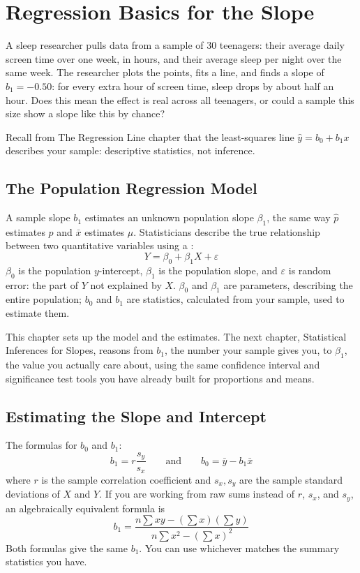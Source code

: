 \chapter{Regression Basics for the Slope}

A sleep researcher pulls data from a sample of $30$ teenagers: their average daily screen time over one week, in hours, and their average sleep per night over the same week. The researcher plots the points, fits a line, and finds a slope of $b_1 = -0.50$: for every extra hour of screen time, sleep drops by about half an hour. Does this mean the effect is real across all teenagers, or could a sample this size show a slope like this by chance?

Recall from The Regression Line chapter that the least-squares line $\hat{y} = b_0 + b_1x$ describes your sample: descriptive statistics, not inference.

\section{The Population Regression Model}
A sample slope $b_1$ estimates an unknown population slope $\beta_1$, the same way $\hat{p}$ estimates $p$ and $\bar{x}$ estimates $\mu$. Statisticians describe the true relationship between two quantitative variables using a :
\[
Y = \beta_0 + \beta_1 X + \varepsilon
\]
$\beta_0$ is the population $y$-intercept, $\beta_1$ is the population slope, and $\varepsilon$ is random error: the part of $Y$ not explained by $X$. $\beta_0$ and $\beta_1$ are parameters, describing the entire population; $b_0$ and $b_1$ are statistics, calculated from your sample, used to estimate them.

This chapter sets up the model and the estimates. The next chapter, Statistical Inferences for Slopes, reasons from $b_1$, the number your sample gives you, to $\beta_1$, the value you actually care about, using the same confidence interval and significance test tools you have already built for proportions and means.

\section{Estimating the Slope and Intercept}

The formulas for $b_0$ and $b_1$:
\[
b_1 = r\frac{s_y}{s_x} \qquad \text{and} \qquad b_0 = \bar{y} - b_1\bar{x}
\]
where $r$ is the sample correlation coefficient and $s_x, s_y$ are the sample standard deviations of $X$ and $Y$. If you are working from raw sums instead of $r$, $s_x$, and $s_y$, an algebraically equivalent formula is
\[
b_1 = \frac{n\sum xy - \left(\sum x\right)\left(\sum y\right)}{n\sum x^2 - \left(\sum x\right)^2}
\]
Both formulas give the same $b_1$. You can use whichever matches the summary statistics you have.

